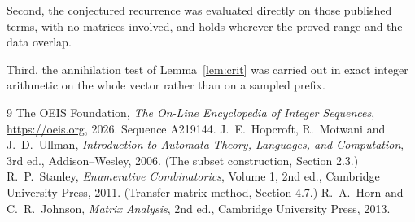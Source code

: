 \documentclass[11pt,a4paper]{article}
\theoremstyle{plain}
\theoremstyle{definition}
\begin{document}
Second, the conjectured recurrence was evaluated directly on those published terms, with no
matrices involved, and holds wherever the proved range and the data overlap.

Third, the annihilation test of Lemma~\ref{lem:crit} was carried out in exact integer
arithmetic on the whole vector rather than on a sampled prefix.

\begin{thebibliography}{9}
 The OEIS Foundation, \emph{The On-Line Encyclopedia of Integer
Sequences}, \url{https://oeis.org}, 2026. Sequence A219144.
 J.~E.~Hopcroft, R.~Motwani and J.~D.~Ullman, \emph{Introduction to Automata
Theory, Languages, and Computation}, 3rd ed., Addison--Wesley, 2006. (The subset
construction, Section 2.3.)
 R.~P.~Stanley, \emph{Enumerative Combinatorics}, Volume 1, 2nd ed.,
Cambridge University Press, 2011. (Transfer-matrix method, Section 4.7.)
 R.~A.~Horn and C.~R.~Johnson, \emph{Matrix Analysis}, 2nd ed., Cambridge
University Press, 2013.
\end{thebibliography}
\end{document}
